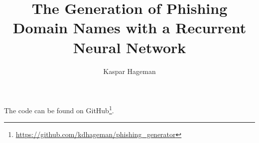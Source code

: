 \documentclass{article}
\title{The Generation of Phishing Domain Names with a Recurrent Neural Network}
\author{Kaspar Hageman}
\begin{document}
\maketitle






The code can be found on GitHub\footnote{\url{https://github.com/kdhageman/phishing_generator}}.
\end{document}
